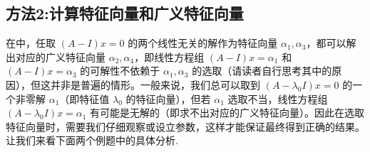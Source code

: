 \documentclass[../../main.tex]{subfiles}%
\begin{document}
\subsection{方法2:计算特征向量和广义特征向量}

在中，任取 $(A - I)x = 0$ 的两个线性无关的解作为特征向量 $\alpha_1,\alpha_3$，都可以解出对应的广义特征向量 $\alpha_2,\alpha_4$，即线性方程组 $(A - I)x = \alpha_1$ 和 $(A - I)x = \alpha_3$ 的可解性不依赖于 $\alpha_1,\alpha_3$ 的选取（请读者自行思考其中的原因），但这并非是普遍的情形。一般来说，我们总可以取到 $(A - \lambda_0I)x = 0$ 的一个非零解 $\alpha_1$（即特征值 $\lambda_0$ 的特征向量），但若 $\alpha_1$ 选取不当，线性方程组 $(A - \lambda_0I)x = \alpha_1$ 有可能是无解的（即求不出对应的广义特征向量）。因此在选取特征向量时，需要我们仔细观察或设立参数，这样才能保证最终得到正确的结果。让我们来看下面两个例题中的具体分析.
\end{document}
